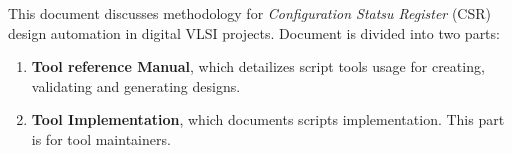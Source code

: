 This document discusses methodology for \emph{Configuration Statsu Register}
(CSR) design automation in digital VLSI projects. Document is divided into 
two parts:
\begin{enumerate}
\item \textbf{Tool reference Manual}, which detailizes script tools usage
  for creating, validating and generating designs. 

\item \textbf{Tool Implementation}, which documents scripts implementation. 
  This part is for tool maintainers.
\end{enumerate}
